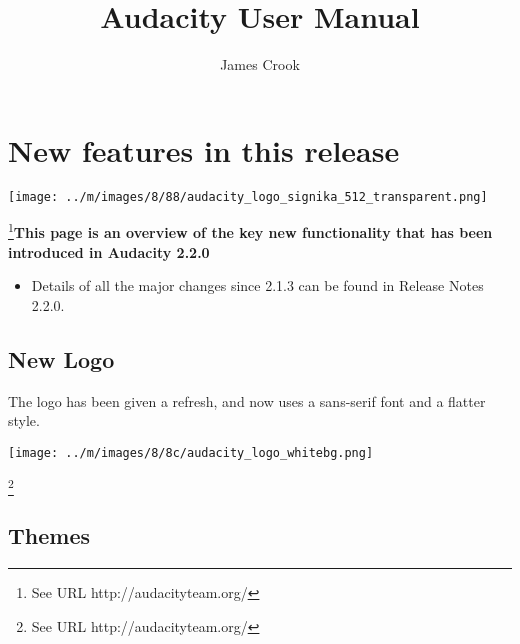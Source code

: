 \documentclass[twocolumn]{book}
\begin{document}
{\let\cleardoublepage\clearpage 
\title{Audacity User Manual}
\author{James Crook}
}


																					
\chapter{New features in this release}

\label{f0}																																	%
					

\par\texttt{[image: ../m/images/8/88/audacity\_logo\_signika\_512\_transparent.png]}\par\footnote{See URL http://audacityteam.org/}\newline\textbf{This page is an overview of the key new functionality that has been introduced in Audacity 2.2.0}
\begin{itemize}
\item  Details of all the major changes since 2.1.3 can be found in Release Notes 2.2.0.
\end{itemize}





\section{New Logo}


The logo has been given a refresh, and now uses a sans-serif font and a flatter style.

\par\texttt{[image: ../m/images/8/8c/audacity\_logo\_whitebg.png]}\par\footnote{See URL http://audacityteam.org/}


\section{Themes}
\end{document}
